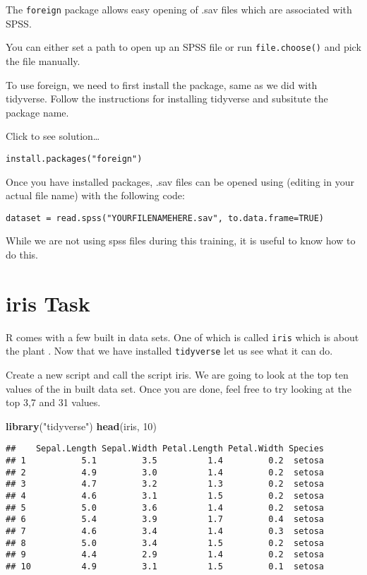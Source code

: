 \documentclass[]{book}
\newenvironment{Shaded}{\begin{snugshade}}{\end{snugshade}}
\newcommand{\DecValTok}[1]{\textcolor[rgb]{0.00,0.00,0.81}{#1}}
\newcommand{\KeywordTok}[1]{\textcolor[rgb]{0.13,0.29,0.53}{\textbf{#1}}}
\newcommand{\NormalTok}[1]{#1}
\newcommand{\StringTok}[1]{\textcolor[rgb]{0.31,0.60,0.02}{#1}}
\begin{document}
The \texttt{foreign} package allows easy opening of .sav files which are associated with SPSS.

You can either set a path to open up an SPSS file or run \texttt{file.choose()} and pick the file manually.

To use foreign, we need to first install the package, same as we did with tidyverse. Follow the instructions for installing tidyverse and subsitute the package name.

Click to see solution\ldots{}

\begin{verbatim}
install.packages("foreign")
\end{verbatim}

Once you have installed packages, .sav files can be opened using (editing in your actual file name) with the following code:

\texttt{dataset\ =\ read.spss("YOURFILENAMEHERE.sav",\ to.data.frame=TRUE)}

While we are not using spss files during this training, it is useful to know how to do this.

\hypertarget{iris-task}{%
\section{iris Task}\label{iris-task}}

R comes with a few built in data sets. One of which is called \texttt{iris} which is about the plant . Now that we have installed \texttt{tidyverse} let us see what it can do.

Create a new script and call the script iris. We are going to look at the top ten values of the in built data set. Once you are done, feel free to try looking at the top 3,7 and 31 values.

\begin{Shaded}
\begin{Highlighting}[]
\KeywordTok{library}\NormalTok{(}\StringTok{"tidyverse"}\NormalTok{)}
\KeywordTok{head}\NormalTok{(iris, }\DecValTok{10}\NormalTok{)}
\end{Highlighting}
\end{Shaded}

\begin{verbatim}
##    Sepal.Length Sepal.Width Petal.Length Petal.Width Species
## 1           5.1         3.5          1.4         0.2  setosa
## 2           4.9         3.0          1.4         0.2  setosa
## 3           4.7         3.2          1.3         0.2  setosa
## 4           4.6         3.1          1.5         0.2  setosa
## 5           5.0         3.6          1.4         0.2  setosa
## 6           5.4         3.9          1.7         0.4  setosa
## 7           4.6         3.4          1.4         0.3  setosa
## 8           5.0         3.4          1.5         0.2  setosa
## 9           4.4         2.9          1.4         0.2  setosa
## 10          4.9         3.1          1.5         0.1  setosa
\end{verbatim}
\end{document}
